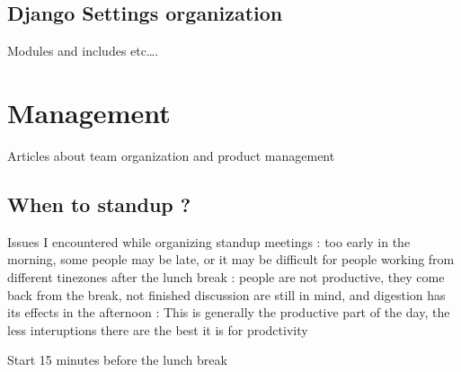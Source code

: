\documentclass[letterpaper,10pt,english]{sphinxmanual}
\begin{document}
\sphinxstepscope


\subsection{Django Settings organization}
\label{\detokenize{articles/python_django/django_settings:django-settings-organization}}\label{\detokenize{articles/python_django/django_settings::doc}}
\sphinxAtStartPar
Modules and includes etc….

\sphinxstepscope


\section{Management}
\label{\detokenize{articles/management/index:management}}\label{\detokenize{articles/management/index::doc}}
\sphinxAtStartPar
Articles about team organization and product management

\sphinxstepscope


\subsection{When to standup ?}
\label{\detokenize{articles/management/standup:when-to-standup}}\label{\detokenize{articles/management/standup::doc}}
\sphinxAtStartPar
Issues I encountered while organizing standup meetings :
\sphinxhyphen{} too early in the morning, some people may be late, or it may be difficult for people working from different tinezones
\sphinxhyphen{} after the lunch break : people are not productive, they come back from the break, not finished discussion are still in mind,
and digestion has its effects
\sphinxhyphen{} in the afternoon : This is generally the productive part of the day, the less interuptions there are the best it is for prodctivity

\sphinxAtStartPar
Start 15 minutes before the lunch break



\renewcommand{\indexname}{Index}
\printindex
\end{document}
